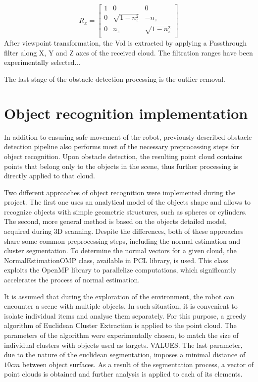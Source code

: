 \begin{equation}
R_x=\left[\begin{array}{ccc}
      1 & 0 & 0  \\
      0 & \sqrt{1 - n_z^2} & -n_z  \\
      0 & n_z & \sqrt{1 - n_z^2}  \\
    \end{array}\right]
\end{equation}
After viewpoint transformation, the VoI is extracted by applying a Passthrough filter along X, Y and Z axes of the received cloud. The filtration ranges have been experimentally selected...

The last stage of the obstacle detection processing is the outlier removal.  
	


\section{Object recognition implementation}
\label{sec:detection}

In addition to ensuring safe movement of the robot, previously described obstacle  detection pipeline also performs most of the necessary preprocessing steps for object recognition. Upon obstacle detection, the resulting point cloud contains points that belong only to the objects in the scene, thus further processing is directly applied to that cloud. 

Two different approaches of object recognition were implemented during the project. The first one uses an analytical model of the objects shape and allows to recognize objects with simple geometric structures, such as spheres or cylinders. The second, more general method is based on the objects detailed model, acquired during 3D scanning. Despite the differences, both of these approaches share some common preprocessing steps, including the normal estimation and cluster segmentation. To determine the normal vectors for a given cloud, the NormalEstimationOMP class, available in PCL library, is used. This class exploits the OpenMP library to parallelize computations, which significantly accelerates the process of normal estimation. 

	It is assumed that during the exploration of the environment, the robot can encounter a scene with multiple objects. In such situation, it is convenient to isolate individual items and analyse them separately. For this purpose, a greedy algorithm of Euclidean Cluster Extraction is applied to the point cloud. The parameters of the algorithm were experimentally chosen, to match the size of individual clusters with objects used as targets. VALUES. The last parameter, due to the nature of the euclidean segmentation, imposes a minimal distance of $10cm$ between object surfaces. As a result of the segmentation process, a vector of point clouds is obtained and further analysis is applied to each of its elements.
	
